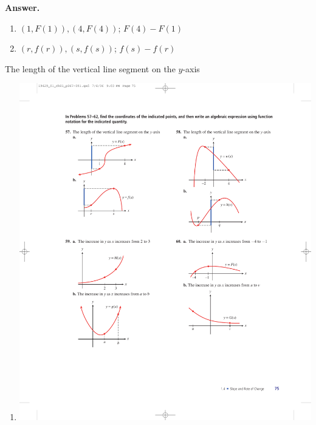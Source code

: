 \documentclass[10pt,]{book}
\theoremstyle{plain}
\theoremstyle{definition}
\theoremstyle{definition}
\theoremstyle{definition}
\theoremstyle{definition}
\numberwithin{equation}{part}
\begin{document}
\begin{exercisegroup}
\begin{multicols}{2}
\begin{enumerate}[label=*\alph**]
%
\end{enumerate}
\end{multicols}
%
\par\smallskip
\noindent\textbf{Answer.}\hypertarget{answer-154}{}\quad
\leavevmode%
\begin{multicols}{2}
\begin{enumerate}[label=*\alph**]
\item\hypertarget{li-1074}{}\((1,F(1)),(4,F(4))\); \(F (4) - F (1)\)%
\item\hypertarget{li-1075}{}\((r,f(r)),(s,f(s))\); \(f (s) - f (r )\)%
\end{enumerate}
\end{multicols}
%
\exercise[58.]\hypertarget{exercise-273}{}The length of the vertical line segment on the \(y\)-axis \leavevmode%
\begin{multicols}{2}
\begin{enumerate}[label=*\alph**]
\item\hypertarget{li-1076}{}\includegraphics[width=0.8\linewidth]{images/fig-ex-1-4-58a}
%

\end{enumerate}
\end{multicols}
\end{exercisegroup}
\end{document}
